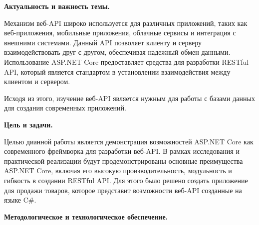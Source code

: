 \documentclass[a4paper,12pt]{report}
\begin{document}


\clearpage
\tableofcontents      %

\clearpage
{}
\begin{acronym}[JPEG]  %
    \acro{}{}
    \acro{}{}
\end{acronym}




\textbf{Актуальность и важность темы.}


Механизм веб-\acs{API} широко используется для различных приложений, таких как веб-приложения, мобильные приложения, 
облачные сервисы и интеграция с внешними системами. Данный API позволяет клиенту и серверу взаимодействовать друг с другом, 
обеспечивая надежный обмен данными. Использование ASP.NET Core предоставляет средства для разработки RESTful API, 
который является стандартом в установлении взаимодействия между клиентом и сервером.

Исходя из этого, изучение веб-\acs{API} является нужным для работы с базами данных для создания современных приложений.

\textbf{Цель и задачи.}

Целью дианной работы является демонстрация возможностей ASP.NET Core как современного фреймворка для разработки веб-\acs{API}. 
В рамках исследования и практической реализации будут продемонстрированы основные преимущества ASP.NET Core, включая его 
высокую производительность, модульность и гибкость в создании \acs{REST}ful \acs{API}. Для этого было решено создать приложение для 
продажи товаров, которое представит возможности веб-\acs{API} созданные на языке C\#.


\textbf{Методологическое и технологическое обеспечение.}
\end{document}
